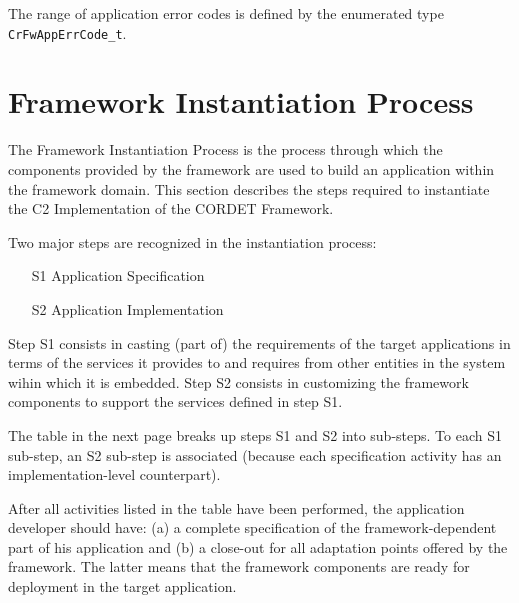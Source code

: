 \documentclass{pnp_article}
\begin{document}
The range of application error codes is defined by the enumerated type \texttt{CrFwAppErrCode\_t}.

\section{Framework Instantiation Process}\label{sec:FwInstantiation}
The Framework Instantiation Process is the process through which the components provided by the framework are used to build an application within the framework domain. This section describes the steps required to instantiate the C2 Implementation of the CORDET Framework.

Two major steps are recognized in the instantiation process: 

\begin{enumerate}
\item[S1] Application Specification
\item[S2] Application Implementation
\end{enumerate}

Step S1 consists in casting (part of) the requirements of the target applications in terms of the services it provides to and requires from other entities in the system wihin which it is embedded. Step S2 consists in customizing the framework components to support the services defined in step S1. 

The table in the next page breaks up steps S1 and S2 into sub-steps. To each S1 sub-step, an S2 sub-step is associated (because each specification activity has an implementation-level counterpart). 

After all activities listed in the table have been performed, the application developer should have: (a) a complete specification of the framework-dependent part of his application and (b) a close-out for all adaptation points offered by the framework. The latter means that the framework components are ready for deployment in the target application. 

\end{document}
